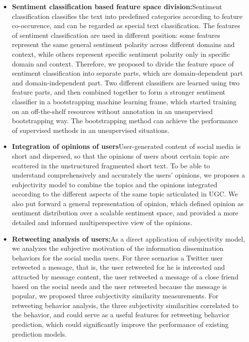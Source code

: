 \begin{eabstract}
\begin{itemize}
\item \textbf{Sentiment classification based feature space division:}Sentiment classification classifies the text into predefined categories according to feature co-occurence, and can be regarded as special text classification. The features of sentiment classification are used in different position: some features represent the same general sentiment  polarity across different domains and context, while others represent specific sentiment polarity only in specific domain and context. Therefore, we proposed to divide the feature space of sentiment classification into separate parts, which are domain-dependent part and domain-independent part. Two different classifiers are learned using two feature parts, and then combined together to form a stronger sentiment classifier in a bootstrapping machine learning frame, which started training on an off-the-shelf resources without annotation in an unsupervised bootstrapping way. The bootstrapping method can achieve the performance of supervised methods in an unsupervised situations.
\item \textbf{Integration of opinions of users}User-generated content of social media is short and dispersed, so that the opinions of users about certain topic are scattered in the unstructured fragmented short text. To be able to understand comprehensively and accurately the users' opinions, we proposes a subjectivity model to combine the topics and the opinions integrated according to the different aspects of the same topic articulated in UGC. We also put forward a general representation of opinion, which defined opinion as sentiment distribution over a scalable sentiment space, and provided a more detailed and informed multiperspective view of the opinions.
\item \textbf{Retweeting analysis of users:}As a direct application of subjectivity model, we analyzes the subjective motivation of the information dissemination behaviors for the social media users. For three scenarios a Twitter user retweeted a message, that is, the user retweeted for he is interested and attracted by message content, the user retweeted a message of a close friend based on the social needs and the user retweeted because the message is popular, we proposed three subjectivity similarity measurements. For retweeting behavior analysis, the three subjectivity similarities correlated to the behavior, and could serve as a useful features for retweeting behavior prediction, which could significantly improve the performance of existing prediction models.
\end{itemize}


\end{eabstract}
